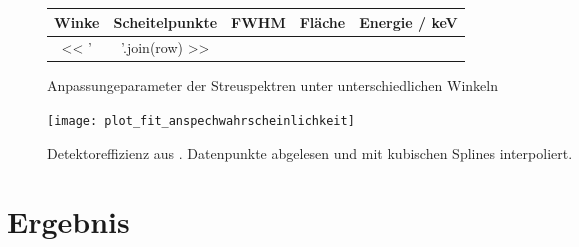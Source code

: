 \documentclass[11pt, ngerman, fleqn, DIV=15, headinclude, BCOR=2cm]{scrreprt}
\newcommand{\plotwidth}{0.8\linewidth}
\begin{document}
\begin{figure}
	\centering
	\begin{tabular}{SSSSS}
		{Winke} &
		{Scheitelpunkte} &
		{FWHM} &
		{Fläche}&
		{Energie / \si{\kilo\electronvolt}}\\
		\midrule
		<< ' & '.join(row) >> \\
	\end{tabular}
	\caption{%
		Anpassungeparameter der Streuspektren unter unterschiedlichen
		Winkeln
	}
	\label{tab:peakanpassung}
\end{figure}


\begin{figure}
    \centering
    \texttt{[image: plot\_fit\_anspechwahrscheinlichkeit]}
    \caption{%
	    Detektoreffizienz aus \parencite{physik512-Anleitung}. Datenpunkte
	    abgelesen und mit kubischen Splines interpoliert.
    }
    \label{fig:plot_fit_anspechwahrscheinlichkeit}
\end{figure}



\chapter{Ergebnis}



\end{document}
